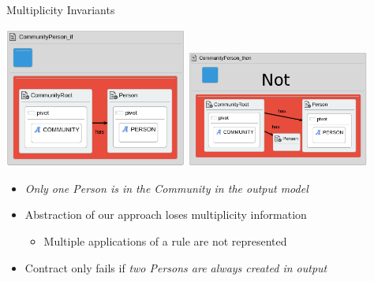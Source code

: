 \documentclass[xcolor=dvipsnames, 12pt, handout]{beamer}
\begin{document}
\begin{frame}{Multiplicity Invariants}
\begin{center}
\includegraphics[width=0.45\textwidth]{figures/communityPersonProp_if}
\includegraphics[width=0.45\textwidth]{figures/communityPersonProp_then}
\end{center}
\begin{itemize}
\item \textit{Only one Person is in the Community in the output model}
\end{itemize}
\begin{itemize}
\item Abstraction of our approach loses multiplicity information
\begin{itemize}
\item Multiple applications of a rule are not represented
\end{itemize}
\item Contract only fails if \textit{two Persons are always created in output}
\end{itemize}
\end{frame}
\end{document}
